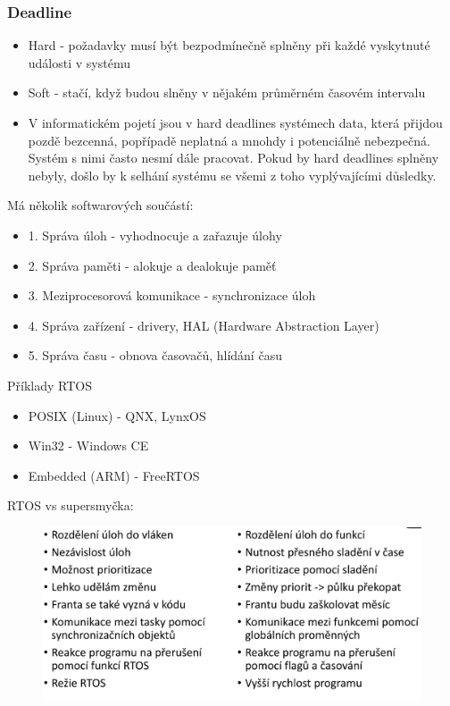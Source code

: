 \subsubsection*{Deadline}
\begin{itemize}
    \item Hard - požadavky musí být bezpodmínečně splněny při každé vyskytnuté události v systému
    \item Soft - stačí, když budou slněny v nějakém průměrném časovém intervalu
    \item V informatickém pojetí jsou v hard deadlines systémech data, která přijdou pozdě bezcenná, popřípadě neplatná a mnohdy i potenciálně nebezpečná. Systém s nimi často nesmí dále pracovat. Pokud by hard deadlines splněny nebyly, došlo by k selhání systému se všemi z toho vyplývajícími důsledky.
\end{itemize}
Má několik softwarových součástí:
\begin{itemize}
    \item 1. Správa úloh - vyhodnocuje a zařazuje úlohy
    \item 2. Správa paměti - alokuje a dealokuje paměť
    \item 3. Meziprocesorová komunikace - synchronizace úloh
    \item 4. Správa zařízení - drivery, HAL (Hardware Abstraction Layer)
    \item 5. Správa času - obnova časovačů, hlídání času
\end{itemize}

Příklady RTOS
\begin{itemize}
    \item POSIX (Linux) - QNX, LynxOS
    \item Win32 - Windows CE
    \item Embedded (ARM) - FreeRTOS
\end{itemize}

RTOS vs supersmyčka:
\begin{figure}[h]
    \begin{center}
        \includegraphics[width = \textwidth]{img/Picture25.png}
    \end{center}
\end{figure}

